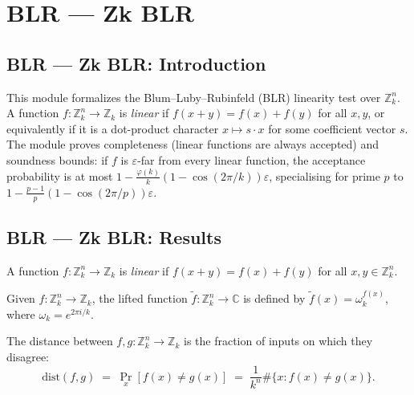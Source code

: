 \section{BLR --- Zk BLR}
\subsection*{BLR --- Zk BLR: Introduction}

This module formalizes the Blum–Luby–Rubinfeld (BLR) linearity test over
$\mathbb{Z}_k^n$.  A function $f : \mathbb{Z}_k^n \to \mathbb{Z}_k$ is
\emph{linear} if $f(x+y)=f(x)+f(y)$ for all $x,y$, or equivalently if it
is a dot-product character $x \mapsto s \cdot x$ for some coefficient vector
$s$.  The module proves completeness (linear functions are always accepted)
and soundness bounds: if $f$ is $\varepsilon$-far from every linear function,
the acceptance probability is at most
$1 - \tfrac{\varphi(k)}{k}(1-\cos(2\pi/k))\varepsilon$,
specialising for prime $p$ to $1 - \tfrac{p-1}{p}(1-\cos(2\pi/p))\varepsilon$.

\subsection*{BLR --- Zk BLR: Results}

\begin{definition}
\label{ZkBLR.is_linear}
\leanok
{}
A function $f : \mathbb{Z}_k^n \to \mathbb{Z}_k$ is \emph{linear} if
$f(x+y) = f(x)+f(y)$ for all $x, y \in \mathbb{Z}_k^n$.
\end{definition}

\begin{definition}
\label{ZkBLR.lift_omega}
\leanok
{}
Given $f : \mathbb{Z}_k^n \to \mathbb{Z}_k$, the lifted function
$\widetilde{f} : \mathbb{Z}_k^n \to \mathbb{C}$ is defined by
$\widetilde{f}(x) = \omega_k^{f(x)}$, where $\omega_k = e^{2\pi i/k}$.
\end{definition}

\begin{definition}
\label{ZkBLR.zk_dist}
\leanok
{}
The distance between $f, g : \mathbb{Z}_k^n \to \mathbb{Z}_k$ is the
fraction of inputs on which they disagree:
\[
  \mathrm{dist}(f,g) \;=\; \Pr_{x}[f(x) \ne g(x)]
  \;=\; \frac{1}{k^n}\#\{x : f(x)\ne g(x)\}.
\]
\end{definition}

